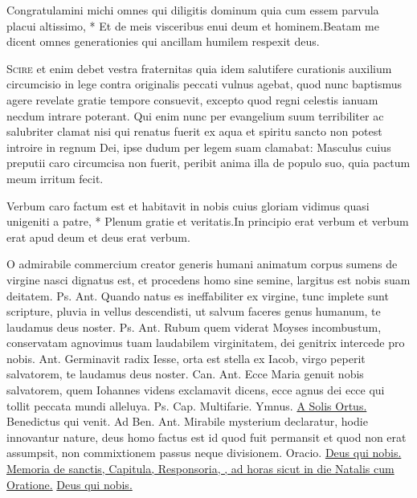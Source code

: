 \begin{multicols*}{2}
\begin{responsory}
{Congratulamini michi omnes qui diligitis dominum quia cum essem parvula placui altissimo, * Et de meis visceribus enui deum et hominem.}{Beatam me dicent omnes generationies qui ancillam humilem respexit deus.}
\end{responsory}
\lettrine[lines=2]{\zallmancaps \color{Blue} S}{cire} et enim debet vestra fraternitas quia idem salutifere curationis auxilium circumcisio in lege contra originalis peccati vulnus agebat, quod nunc baptismus agere revelate gratie tempore consuevit, excepto quod regni celestis ianuam necdum intrare poterant. Qui enim nunc per evangelium suum terribiliter ac salubriter clamat nisi qui renatus fuerit ex aqua et spiritu sancto non potest introire in regnum Dei, ipse dudum per legem suam clamabat: Masculus cuius preputii caro circumcisa non fuerit, peribit anima illa de populo suo, quia pactum meum irritum fecit.
\begin{responsory-doxology}
{Verbum caro factum est et habitavit in nobis cuius gloriam vidimus quasi unigeniti a patre, * Plenum gratie et veritatis.}{In principio erat verbum et verbum erat apud deum et deus erat verbum.}
\end{responsory-doxology}
 O admirabile commercium creator generis humani animatum corpus sumens de virgine nasci dignatus est, et procedens homo sine semine, largitus est nobis suam deitatem. {\color{Red} Ps.}  {\color{Red} Ant.} Quando natus es ineffabiliter ex virgine, tunc implete sunt scripture, pluvia in vellus descendisti, ut salvum faceres genus humanum, te laudamus deus noster. {\color{Red} Ps.}  {\color{Red} Ant.} Rubum quem viderat Moyses incombustum, conservatam agnovimus tuam laudabilem virginitatem, dei genitrix intercede pro nobis.  {\color{Red} Ant.} Germinavit radix Iesse, orta est stella ex Iacob, virgo peperit salvatorem, te laudamus deus noster. {\color{Red} Can.}  {\color{Red} Ant.} Ecce Maria genuit nobis salvatorem, quem Iohannes videns exclamavit dicens, ecce agnus dei ecce qui tollit peccata mundi alleluya. {\color{Red} Ps.}  {\color{Red} Cap.} Multifarie. {\color{Red} Ymnus.} \hyperlink{a-solis-ortus}{A Solis Ortus.} \V Benedictus qui venit. {\color{Red} Ad Ben. Ant.} Mirabile mysterium declaratur, hodie innovantur nature, deus homo factus est id quod fuit permansit et quod non erat assumpsit, non commixtionem passus neque divisionem. {\color{Red} Oracio.} \hyperlink{deus-nobis-circumcisionis}{Deus qui nobis.} \ul{Memoria de sanctis, Capitula, Responsoria, \Vbar , ad horas sicut in die Natalis cum Oratione.} \hyperlink{deus-nobis-circumcisionis}{Deus qui nobis.}

\end{multicols*}
